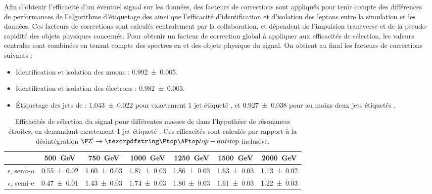 Afin d'obtenir l'efficacité d'un éventuel signal sur les données, des facteurs de corrections sont appliqués pour tenir compte des différences de performances de l'algorithme d'étiquetage des \Pbottom ainsi que l'efficacité d'identification et d'isolation des leptons entre la simulation et les données. Ces facteurs de corrections sont calculés centralement par la collaboration, et dépendent de l'impulsion transverse et de la pseudo-rapidité des objets physiques concernés. Pour obtenir un facteur de correction global à appliquer aux efficacités de sélection, les valeurs centrales sont combinées en tenant compte des spectres en \pt et \aeta des objets physique du signal. On obtient au final les facteurs de corrections suivants :
\begin{itemize}
  \item Identification et isolation des muons : \num{0.992 \pm 0.005}.
  \item Identification et isolation des électrons : \num{0.982 \pm 0.003}.
  \item Étiquetage des jets de \Pbottom : \num{1.043 \pm 0.022} pour exactement 1 jet étiqueté \Pbottom, et \num{0.927 \pm 0.038} pour au moins deux jets étiquetés \Pbottom.
\end{itemize}

\begin{table}[p] \centering
  \begin{tabular}{ccccccc} \toprule
    & \SI{500}{\GeV} & \SI{750}{\GeV} & \SI{1000}{\GeV} & \SI{1250}{\GeV} & \SI{1500}{\GeV} & \SI{2000}{\GeV} \\ \midrule
    $\epsilon$, semi-$\mu$ & \num{0.55 \pm 0.02} & \num{1.60 \pm 0.03} & \num{1.87 \pm 0.03} & \num{1.86 \pm 0.03} & \num{1.63 \pm 0.03} & \num{1.13 \pm 0.02} \\
    $\epsilon$, semi-e & \num{0.47 \pm 0.01} & \num{1.43 \pm 0.03} & \num{1.74 \pm 0.03} & \num{1.80 \pm 0.03} & \num{1.61 \pm 0.03} & \num{1.22 \pm 0.03} \\ \bottomrule
  \end{tabular}
  \caption{Efficacités de sélection du signal pour différentes masses de \zprime dans l'hypothèse de résonances étroites, en demandant exactement 1 jet étiqueté \Pbottom. Ces efficacités sont calculés par rapport à la désintégration $\zprime \rightarrow \ttbar$ inclusive.}
  \label{tab:eff_narrow_1b}
\end{table}

